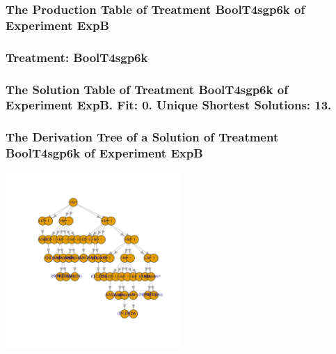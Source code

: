 \documentclass[18pt,c]{beamer}
\begin{document}
 \begin{frame}
 \fontsize{8pt}{9pt}\selectfont
 \frametitle{ The Production Table of Treatment BoolT4sgp6k of Experiment ExpB }

 \label{ExpBGrammarTable033.tex}  
 \end{frame}

 \begin{frame}
 \fontsize{8pt}{9pt}\selectfont
 \frametitle{ Treatment: BoolT4sgp6k }

 \label{ExpBStatsTable031.tex}  
 \end{frame}

 \begin{frame}
 \fontsize{8pt}{9pt}\selectfont
 \frametitle{ The Solution Table of Treatment BoolT4sgp6k of Experiment ExpB. Fit: 0. Unique Shortest Solutions: 13. }

 \label{ExpBSolutionTable024.tex}  
 \end{frame}

 \begin{frame}
 \frametitle{ The Derivation Tree of a Solution of Treatment BoolT4sgp6k of Experiment ExpB }
 \begin{center}
\includegraphics[width=0.5\textwidth, angle=0]
{ExpBDerivationTreeFigure024.pdf}
 \end{center}
 \label{report/ExpBDerivationTreeFigure024.pdf}  
 \end{frame}
\end{document}
